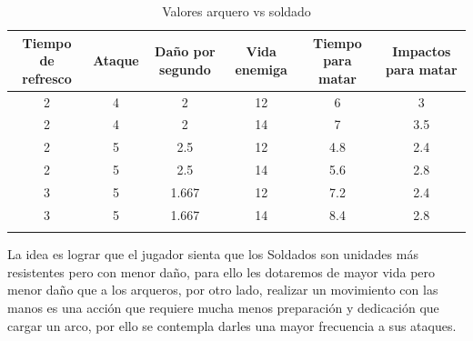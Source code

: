 \begin{longtable}[c]{|c|c|c|c|c|c|}
\hline
\multicolumn{1}{|m{1.8cm}|}{Tiempo de refresco} & \multicolumn{1}{m{1.2cm}|}{Ataque}             &
\multicolumn{1}{m{1.7cm}|}{Daño por segundo}   & \multicolumn{1}{m{1.4cm}|}{Vida enemiga}        &
\multicolumn{1}{m{1.2cm}|}{Tiempo para matar}  & \multicolumn{1}{m{1.45cm}|}{Impactos para matar}\\
\hline
\hline
\endhead
\multicolumn{1}{|S|}{2} & \multicolumn{1}{S|}{4} & \multicolumn{1}{S|}{2} & 
\multicolumn{1}{S|}{12} & \multicolumn{1}{S|}{6} & \multicolumn{1}{S|}{3} \\
\hline
\multicolumn{1}{|S|}{2} & \multicolumn{1}{S|}{4} & \multicolumn{1}{S|}{2}   & 
\multicolumn{1}{S|}{14} & \multicolumn{1}{S|}{7} & \multicolumn{1}{S|}{3.5} \\ 
\hline
\multicolumn{1}{|S|}{2} & \multicolumn{1}{S|}{5}   & \multicolumn{1}{S|}{2.5} & 
\multicolumn{1}{S|}{12} & \multicolumn{1}{S|}{4.8} & \multicolumn{1}{S|}{2.4} \\ 
\hline
\multicolumn{1}{|S|}{2} & \multicolumn{1}{S|}{5}   & \multicolumn{1}{S|}{2.5} & 
\multicolumn{1}{S|}{14} & \multicolumn{1}{S|}{5.6} & \multicolumn{1}{S|}{2.8} \\
\hline
\multicolumn{1}{|S|}{3} & \multicolumn{1}{S|}{5}   & \multicolumn{1}{S|}{1.667} & 
\multicolumn{1}{S|}{12} & \multicolumn{1}{S|}{7.2} & \multicolumn{1}{S|}{2.4}   \\
\hline
\multicolumn{1}{|S|}{3} & \multicolumn{1}{S|}{5}   & \multicolumn{1}{S|}{1.667} & 
\multicolumn{1}{S|}{14} & \multicolumn{1}{S|}{8.4} & \multicolumn{1}{S|}{2.8}   \\
\hline
\caption{Valores arquero vs soldado}
\end{longtable}

La idea es lograr que el jugador sienta que los Soldados son unidades más resistentes pero con menor
daño, para ello les dotaremos de mayor vida pero menor daño que a los arqueros, por otro lado, realizar
un movimiento con las manos es una acción que requiere mucha menos preparación y dedicación que cargar 
un arco, por ello se contempla darles una mayor frecuencia a sus ataques.

